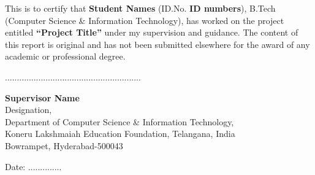 \begin{doublespace}

This is to certify that \textbf{Student Names} (ID.No. \textbf{ID numbers}), B.Tech (Computer Science \& Information Technology), has worked on the project entitled \textbf{``Project Title''} under my supervision and guidance. The content of this report is original and has not been submitted elsewhere for the award of any academic or professional degree.

\end{doublespace}


\par \null \par \par \null \par \par \null \par \par \null \par
\begin{flushleft}
.........................................................\\
\par\null\par
\textbf{Supervisor Name}\\
Designation,\\
Department of Computer Science \& Information Technology,\\
Koneru Lakshmaiah Education Foundation, Telangana, India\\
Bowrampet, Hyderabad-500043\\

\end{flushleft}
\par \null \par \par \null \par
Date: ..............